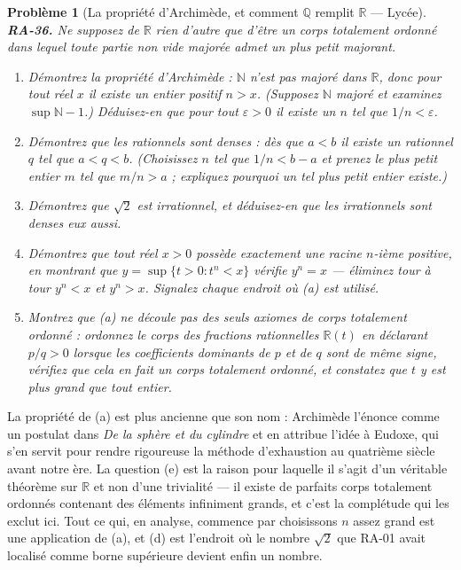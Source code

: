 \documentclass[11pt]{article}
\newtheorem{problem}{Problème}
\begin{document}
\begin{problem}[{La propriété d'Archimède, et comment $\mathbb{Q}$ remplit $\mathbb{R}$ --- Lycée}]
\textbf{RA-36.} Ne supposez de $ \mathbb{R} $ rien d'autre que d'être un corps totalement
ordonné dans lequel toute partie non vide majorée admet un plus petit majorant.
\begin{enumerate}
\item[(a)] Démontrez la propriété d'Archimède : $ \mathbb{N} $ n'est pas majoré dans $ \mathbb{R} $,
donc pour tout réel $ x $ il existe un entier positif $ n > x $. (Supposez $ \mathbb{N} $
majoré et examinez $ \sup \mathbb{N} - 1 $.) Déduisez-en que pour tout
$ \varepsilon > 0 $ il existe un $ n $ tel que $ 1/n < \varepsilon $.
\item[(b)] Démontrez que les rationnels sont denses : dès que $ a < b $ il existe un rationnel $ q $
tel que $ a < q < b $. (Choisissez $ n $ tel que $ 1/n < b-a $ et prenez le plus petit
entier $ m $ tel que $ m/n > a $ ; expliquez pourquoi un tel plus petit entier existe.)
\item[(c)] Démontrez que $ \sqrt{2} $ est irrationnel, et déduisez-en que les irrationnels sont denses
eux aussi.
\item[(d)] Démontrez que tout réel $ x > 0 $ possède exactement une racine $ n $-ième positive, en
montrant que $ y = \sup\{ t > 0 : t^n < x \} $ vérifie $ y^n = x $ --- éliminez tour à tour
$ y^n < x $ et $ y^n > x $. Signalez chaque endroit où (a) est utilisé.
\item[(e)] Montrez que (a) ne découle pas des seuls axiomes de corps totalement ordonné : ordonnez le corps
des fractions rationnelles $ \mathbb{R}(t) $ en déclarant $ p/q > 0 $ lorsque les coefficients
dominants de $ p $ et de $ q $ sont de même signe, vérifiez que cela en fait un corps totalement
ordonné, et constatez que $ t $ y est plus grand que tout entier.
\end{enumerate}

\end{problem}

\noindent La propriété de (a) est plus ancienne que son nom : Archimède l'énonce comme un
postulat dans \textit{De la sphère et du cylindre} et en attribue l'idée à Eudoxe, qui s'en servit pour
rendre rigoureuse la méthode d'exhaustion au quatrième siècle avant notre ère. La question (e) est la
raison pour laquelle il s'agit d'un véritable théorème sur $ \mathbb{R} $ et non d'une trivialité ---
il existe de parfaits corps totalement ordonnés contenant des éléments infiniment grands, et c'est la
complétude qui les exclut ici. Tout ce qui, en analyse, commence par \og{} choisissons $ n $ assez
grand \fg{} est une application de (a), et (d) est l'endroit où le nombre $ \sqrt{2} $ que RA-01 avait
localisé comme borne supérieure devient enfin un nombre.
\end{document}
